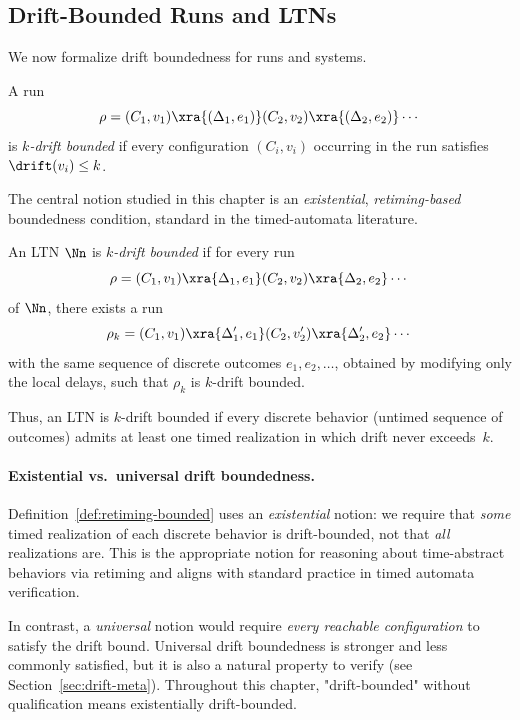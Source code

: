 \subsection{Drift-Bounded Runs and LTNs}

We now formalize drift boundedness for runs and systems.

\begin{definition}
\label{def:drift-bounded-run}
A run
\[
  \rho = (C_1,v_1)\xra{(\Delta_1,e_1)}(C_2,v_2)\xra{(\Delta_2,e_2)}\cdots
\]
is \emph{$k$-drift bounded} if every configuration $(C_i,v_i)$ occurring in the run satisfies $\drift(v_i) \le k$.
\end{definition}

The central notion studied in this chapter is an \emph{existential}, \emph{retiming-based} boundedness condition, standard in the timed-automata literature.

\begin{definition}
\label{def:retiming-bounded}
An LTN $\Nn$ is \emph{$k$-drift bounded} if for every run
\[
  \rho = (C_1,v_1)\xra{\Delta_1,e_1}(C_2,v_2)\xra{\Delta_2,e_2}\cdots
\]
of $\Nn$, there exists a run
\[
  \rho_k = (C_1,v_1)\xra{\Delta'_1,e_1}(C_2,v'_2)\xra{\Delta'_2,e_2}\cdots
\]
with the same sequence of discrete outcomes $e_1, e_2, \ldots$, obtained by modifying only the local delays, such that $\rho_k$ is $k$-drift bounded.
\end{definition}

Thus, an LTN is $k$-drift bounded if every discrete behavior (untimed sequence of outcomes) admits at least one timed realization in which drift never exceeds~$k$.

\paragraph{Existential vs.\ universal drift boundedness.}
Definition~\ref{def:retiming-bounded} uses an \emph{existential} notion: we require that \emph{some} timed realization of each discrete behavior is drift-bounded, not that \emph{all} realizations are. This is the appropriate notion for reasoning about time-abstract behaviors via retiming and aligns with standard practice in timed automata verification.

In contrast, a \emph{universal} notion would require \emph{every reachable configuration} to satisfy the drift bound. Universal drift boundedness is stronger and less commonly satisfied, but it is also a natural property to verify (see Section~\ref{sec:drift-meta}). Throughout this chapter, "drift-bounded" without qualification means existentially drift-bounded.

